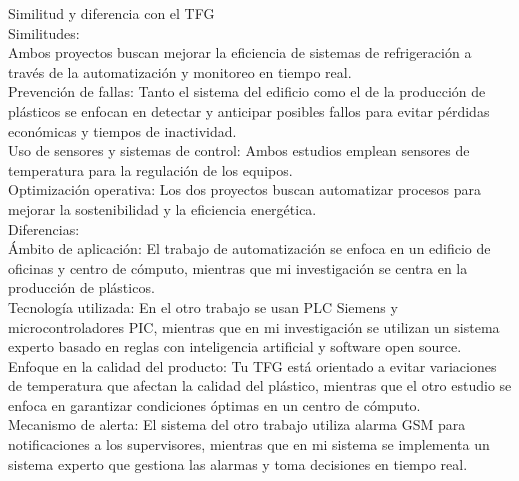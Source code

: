 Similitud y diferencia con el TFG\\
Similitudes:\\
Ambos proyectos buscan mejorar la eficiencia de sistemas de refrigeración a través de la automatización y monitoreo en tiempo real. \\
Prevención de fallas: Tanto el sistema del edificio como el de la producción de plásticos se enfocan en detectar y anticipar posibles fallos para evitar pérdidas económicas y tiempos de inactividad. \\
Uso de sensores y sistemas de control: Ambos estudios emplean sensores de temperatura para la regulación de los equipos. \\
Optimización operativa: Los dos proyectos buscan automatizar procesos para mejorar la sostenibilidad y la eficiencia energética. \\
Diferencias: \\
Ámbito de aplicación: El trabajo de automatización se enfoca en un edificio de oficinas y centro de cómputo, mientras que mi investigación se centra en la producción de plásticos. \\
Tecnología utilizada: En el otro trabajo se usan PLC Siemens y microcontroladores PIC, mientras que en mi investigación se utilizan un sistema experto basado en reglas con inteligencia artificial y software open source. \\
Enfoque en la calidad del producto: Tu TFG está orientado a evitar variaciones de temperatura que afectan la calidad del plástico, mientras que el otro estudio se enfoca en garantizar condiciones óptimas en un centro de cómputo. \\
Mecanismo de alerta: El sistema del otro trabajo utiliza alarma GSM para notificaciones a los supervisores, mientras que en mi sistema se implementa un sistema experto que gestiona las alarmas y toma decisiones en tiempo real. \\

